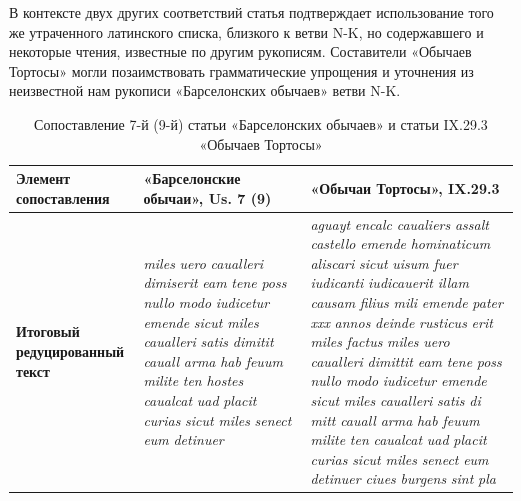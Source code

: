 В контексте двух других соответствий статья подтверждает использование того же утраченного латинского списка, близкого к ветви N-K, но содержавшего и некоторые чтения, известные по другим рукописям. Составители «Обычаев Тортосы» могли позаимствовать грамматические упрощения и уточнения из неизвестной нам рукописи «Барселонских обычаев» ветви N-K.

\begin{center}
\small
\setlength{\tabcolsep}{2pt}
\begin{longtable}{|p{}|p{}|p{}|}
\caption{Сопоставление 7-й (9-й) статьи «Барселонских обычаев» и статьи IX.29.3 «Обычаев Тортосы»}\label{tab:ch1-tortosa-9}\\
\hline
\textbf{Элемент сопоставления} & \textbf{«Барселонские обычаи», }\textbf{Us}\textbf{. }\textbf{7 (}\textbf{9}\textbf{)} & \textbf{«Обычаи Тортосы», }\textbf{IX}\textbf{.29.3} \\ \hline
\textbf{Итоговый редуцированный текст} & \emph{miles}\emph{ }\emph{uero}\emph{ }\emph{caualleri}\emph{ }\emph{dimiserit}\emph{ }\emph{eam}\emph{ }\emph{tene}\emph{ }\emph{poss}\emph{ }\emph{nullo}\emph{ }\emph{modo}\emph{ }\emph{iudicetur}\emph{ }\emph{emende}\emph{ }\emph{sicut}\emph{ }\emph{miles}\emph{ }\emph{caualleri}\emph{ }\emph{satis}\emph{ }\emph{dimitit}\emph{ }\emph{cauall}\emph{ }\emph{arma}\emph{ }\emph{hab}\emph{ }\emph{feuum}\emph{ }\emph{milite}\emph{ }\emph{ten}\emph{ }\emph{hostes}\emph{ }\emph{caualcat}\emph{ }\emph{uad}\emph{ }\emph{placit}\emph{ }\emph{curias}\emph{ }\emph{sicut}\emph{ }\emph{miles}\emph{ }\emph{senect}\emph{ }\emph{eum}\emph{ }\emph{detinuer} & \emph{aguayt}\emph{ }\emph{encalc}\emph{ }\emph{caualiers}\emph{ }\emph{assalt}\emph{ }\emph{castello}\emph{ }\emph{emende}\emph{ }\emph{hominaticum}\emph{ }\emph{aliscari}\emph{ }\emph{sicut}\emph{ }\emph{uisum}\emph{ }\emph{fuer}\emph{ }\emph{iudicanti}\emph{ }\emph{iudicauerit}\emph{ }\emph{illam}\emph{ }\emph{causam}\emph{ }\emph{filius}\emph{ }\emph{mili}\emph{ }\emph{emende}\emph{ }\emph{pater}\emph{ }\emph{xxx}\emph{ }\emph{annos}\emph{ }\emph{deinde}\emph{ }\emph{rusticus}\emph{ }\emph{erit}\emph{ }\emph{miles}\emph{ }\emph{factus}\emph{ }\emph{miles}\emph{ }\emph{uero}\emph{ }\emph{caualleri}\emph{ }\emph{dimittit}\emph{ }\emph{eam}\emph{ }\emph{tene}\emph{ }\emph{poss}\emph{ }\emph{nullo}\emph{ }\emph{modo}\emph{ }\emph{iudicetur}\emph{ }\emph{emende}\emph{ }\emph{sicut}\emph{ }\emph{miles}\emph{ }\emph{caualleri}\emph{ }\emph{satis}\emph{ }\emph{di}\emph{ }\emph{mitt}\emph{ }\emph{cauall}\emph{ }\emph{arma}\emph{ }\emph{hab}\emph{ }\emph{feuum}\emph{ }\emph{milite}\emph{ }\emph{ten}\emph{ }\emph{caualcat}\emph{ }\emph{uad}\emph{ }\emph{placit}\emph{ }\emph{curias}\emph{ }\emph{sicut}\emph{ }\emph{miles}\emph{ }\emph{senect}\emph{ }\emph{eum}\emph{ }\emph{detinuer}\emph{ }\emph{ciues}\emph{ }\emph{burgens}\emph{ }\emph{sint}\emph{ }\emph{pla} \\ \hline

\end{longtable}
\end{center}
